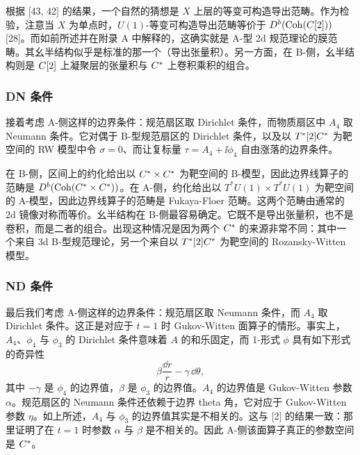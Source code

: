 根据 [43, 42] 的结果，一个自然的猜想是 $X$ 上层的等变可构造导出范畴。作为检验，注意当 $X$ 为单点时，$U(1)$-等变可构造导出范畴等价于 $D^b(\mathrm{Coh}(C[2]))$ [28]。而如前所述并在附录 A 中解释的，这确实就是 A-型 2d 规范理论的膜范畴。其幺半结构似乎是标准的那一个（导出张量积）。另一方面，在 B-侧，幺半结构则是 $C[2]$ 上凝聚层的张量积与 $C^*$ 上卷积乘积的组合。

\subsubsection{DN 条件}

接着考虑 A-侧这样的边界条件：规范扇区取 Dirichlet 条件，而物质扇区中 $A_4$ 取 Neumann 条件。它对偶于 B-型规范扇区的 Dirichlet 条件，以及以 $T^*[2]C^*$ 为靶空间的 RW 模型中令 $\sigma=0$、而让复标量 $\tau=A_4+\ii\phi_4$ 自由涨落的边界条件。

在 B-侧，区间上的约化给出以 $C^*\times C^*$ 为靶空间的 B-模型，因此边界线算子的范畴是 $D^b(\mathrm{Coh}(C^*\times C^*))$。在 A-侧，约化给出以 $T^*U(1)\times T^*U(1)$ 为靶空间的 A-模型，因此边界线算子的范畴是 Fukaya-Floer 范畴。这两个范畴由通常的 2d 镜像对称而等价。幺半结构在 B-侧最容易确定。它既不是导出张量积，也不是卷积，而是二者的组合。出现这种情况是因为两个 $C^*$ 的来源非常不同：其中一个来自 3d B-型规范理论，另一个来自以 $T^*[2]C^*$ 为靶空间的 Rozansky-Witten 模型。

\subsubsection{ND 条件}

最后我们考虑 A-侧这样的边界条件：规范扇区取 Neumann 条件，而 $A_4$ 取 Dirichlet 条件。这正是对应于 $t=1$ 时 Gukov-Witten 面算子的情形。事实上，$A_4$、$\phi_4$ 与 $\phi_3$ 的 Dirichlet 条件意味着 $A$ 的和乐固定，而 1-形式 $\phi$ 具有如下形式的奇异性
\[
  \beta\frac{\dd r}{r}-\gamma\,\dd\theta,
\]
其中 $-\gamma$ 是 $\phi_4$ 的边界值，$\beta$ 是 $\phi_3$ 的边界值。$A_4$ 的边界值是 Gukov-Witten 参数 $\alpha$。规范扇区的 Neumann 条件还依赖于边界 theta 角，它对应于 Gukov-Witten 参数 $\eta$。如上所述，$A_4$ 与 $\phi_3$ 的边界值其实是不相关的。这与 [2] 的结果一致：那里证明了在 $t=1$ 时参数 $\alpha$ 与 $\beta$ 是不相关的。因此 A-侧该面算子真正的参数空间是 $C^*$。



